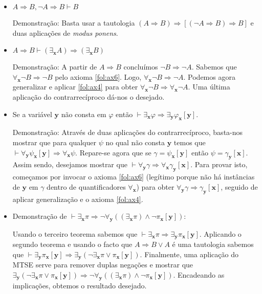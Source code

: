 \documentclass{report}
\theoremstyle{definition}
\theoremstyle{remark}
\renewcommand{\bf}[1]{\mathbf{#1}}
\newcommand{\imply}{\mathbin{\Rightarrow}}
\begin{document}
\begin{itemize}
	\item $A \imply B, \neg A \imply B \vdash B$

	Demonstração: Basta usar a tautologia $(A \imply B) \imply [(\neg A \imply B) \imply B]$ e duas aplicações de \textit{modus ponens}.

	\item $A \imply B \vdash (\exists_{\bf x} A) \imply (\exists_{\bf x} B)$
	
	Demonstração: A partir de $A \imply B$ concluímos $\neg B \imply \neg A$. Sabemos que $\forall_{\bf x} \neg B \imply \neg B$ pelo axioma \eqref{fol:ax6}. Logo, $\forall_{\bf x} \neg B \imply \neg A$. Podemos agora generalizar e aplicar \eqref{fol:ax4} para obter $\forall_{\bf x} \neg B \imply \forall_{\bf x} \neg A$. Uma última aplicação do contrarrecíproco dá-nos o desejado.

	\item Se a variável $\bf y$ não consta em $\varphi$ então $\vdash \exists_{\bf x} \varphi \imply \exists_{\bf y} \varphi_{\bf x}[\bf y]$.

	Demonstração: Através de duas aplicações do contrarrecíproco, basta-nos mostrar que para qualquer $\psi$ no qual não consta $\bf y$ temos que $\vdash \forall_{\bf y} \psi_{\bf x}[\bf y] \imply \forall_{\bf x} \psi$. Repare-se agora que se $\gamma = \psi_{\bf x}[\bf y]$ então $\psi = \gamma_{\bf y}[\bf x]$. Assim sendo, desejamos mostrar que $\vdash \forall_{\bf y} \gamma \imply \forall_{\bf x} \gamma_{\bf y}[\bf x]$. Para provar isto, começamos por invocar o axioma \eqref{fol:ax6} (legítimo porque não há instâncias de $\bf y$ em $\gamma$ dentro de quantificadores $\forall_{\bf x}$) para obter $\forall_{\bf y} \gamma \imply \gamma_{\bf y}[\bf x]$, seguido de aplicar generalização e o axioma \eqref{fol:ax4}.

	\item Demonstração de $\vdash \exists_{\bf x} \pi \imply \neg \forall_{\bf y} ( (\exists_{\bf x} \pi) \land \neg \pi_{\bf x}[\bf y])$:

	Usando o terceiro teorema sabemos que $\vdash \exists_{\bf x} \pi \imply \exists_{\bf y} \pi_{\bf x}[\bf y]$. Aplicando o segundo teorema e usando o facto que $A \imply B \lor A$ é uma tautologia sabemos que $\vdash \exists_{\bf y} \pi_{\bf x}[\bf y] \imply \exists_{\bf y} (\neg \exists_{\bf x} \pi \lor \pi_{\bf x}[\bf y])$. Finalmente, uma aplicação do MTSE serve para remover duplas negações e mostrar que $\exists_{\bf y} (\neg \exists_{\bf x} \pi \lor \pi_{\bf x}[\bf y]) \imply \neg \forall_{\bf y} ( (\exists_{\bf x} \pi) \land \neg \pi_{\bf x}[\bf y])$. Encadeando as implicações, obtemos o resultado desejado.


\end{itemize}
\end{document}
